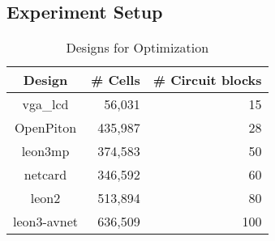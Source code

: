 \subsection{Experiment Setup}
\vspace{-5mm}

\begin{table}[H]
  \centering
  \caption{Designs for Optimization}
  \begin{tabular}{ crr }
    \hline
    Design & \# Cells & \# Circuit blocks \\
    \hline
    vga\_lcd & 56,031 & 15 \\
    OpenPiton & 435,987 & 28 \\
    leon3mp & 374,583 & 50 \\
    netcard & 346,592 & 60 \\
    leon2 & 513,894 & 80 \\
    leon3-avnet & 636,509 & 100 \\
    \hline
  \end{tabular}
  \label{tab:designs}
\end{table}
\vspace{-3mm}


